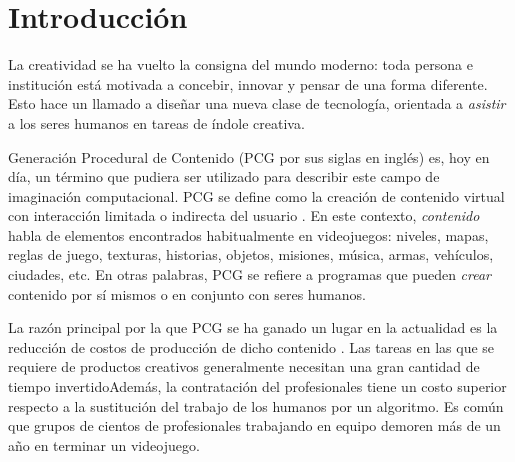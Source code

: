 \chapter*{Introducción}\label{chapter:introduction}




La creatividad se ha vuelto la consigna del mundo moderno: toda persona e institución
está motivada a concebir, innovar y pensar de una forma diferente. 
Esto hace un llamado a diseñar una nueva clase de tecnología, orientada a
\textit{asistir} a los seres humanos en tareas de índole creativa.

Generación Procedural de Contenido (PCG por sus siglas en inglés)
es, hoy en día, un término que pudiera ser utilizado para describir este campo de imaginación
computacional. PCG se define como la creación de contenido virtual con interacción
limitada o indirecta del usuario \cite{bib:5}. En este contexto, \textit{contenido} habla
de elementos encontrados habitualmente en videojuegos: niveles, mapas,
reglas de juego, texturas, historias, objetos, misiones, música,
armas, vehículos, ciudades, etc. En otras palabras, PCG se refiere
a programas que pueden \textit{crear} contenido por sí mismos
o en conjunto con seres humanos. 

La razón principal por la que PCG se ha ganado un lugar en la actualidad
es la reducción de costos de producción de dicho contenido \cite{bib:11}. Las tareas en las que se
requiere de productos creativos generalmente necesitan
una gran cantidad de tiempo invertidoAdemás, la contratación del profesionales
tiene un costo superior respecto a la sustitución del trabajo de los humanos por un algoritmo.
Es común que grupos de cientos
de profesionales trabajando en equipo demoren más de un año en terminar un videojuego.


